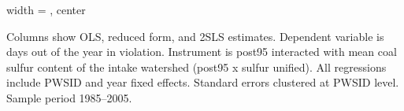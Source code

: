 \begin{table}[htbp]
\begin{adjustbox}{width = \textwidth, center}
      
      
   \end{adjustbox}
      {\tiny\linespread{1}\selectfont \par \raggedright 
   Columns show OLS, reduced form, and 2SLS estimates. Dependent variable is days out of the year in violation. Instrument is post95 interacted with mean coal sulfur content of the intake watershed (post95 x sulfur unified). All regressions include PWSID and year fixed effects. Standard errors clustered at PWSID level. Sample period 1985--2005.}
   
\end{table}



